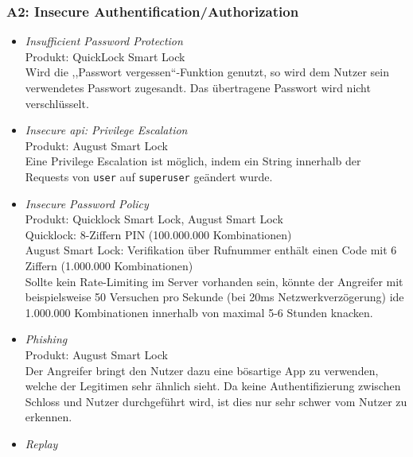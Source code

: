     \subsubsection*{A2: Insecure Authentification/Authorization}
        \begin{itemize}[leftmargin=0cm,label={}]
            \item \emph{Insufficient Password Protection}\cite{Ye2017}\label{vuln:pwdprot}\\
    	        Produkt: QuickLock Smart Lock\\ 
                Wird die ,,Passwort vergessen``-Funktion genutzt, so wird dem Nutzer sein verwendetes Passwort zugesandt. 
                Das übertragene Passwort wird nicht verschlüsselt.
            \item \emph{Insecure \gls{api}: Privilege Escalation}\cite{Fuller2017,Lariviere2015}\label{vuln:privesc}\\
                Produkt: August Smart Lock\\
                Eine Privilege Escalation ist möglich, indem ein String innerhalb der Requests von \colorbox{light-gray}{\lstinline{user}} auf \colorbox{light-gray}{\lstinline{superuser}} geändert wurde.
            \item \emph{Insecure Password Policy}\cite{Rose2016,Ye2017,Jmaxxz2015a}\label{vuln:pwdpol}\\
                Produkt: Quicklock Smart Lock, August Smart Lock\\
                Quicklock: 8-Ziffern PIN (100.000.000 Kombinationen)\\
                August Smart Lock: Verifikation über Rufnummer enthält einen Code mit 6 Ziffern (1.000.000 Kombinationen)\\
                Sollte kein Rate-Limiting im Server vorhanden sein, könnte der Angreifer mit beispielsweise 50 Versuchen pro Sekunde (bei 20ms Netzwerkverzögerung) ide 1.000.000 Kombinationen innerhalb von maximal 5-6 Stunden knacken.
            \item \emph{Phishing}\cite{Ye2017}\label{vuln:phishing}\\
    	        Produkt: August Smart Lock\\ 
                Der Angreifer bringt den Nutzer dazu eine bösartige App zu verwenden, welche der Legitimen sehr ähnlich sieht. 
                Da keine Authentifizierung zwischen Schloss und Nutzer durchgeführt wird, ist dies nur sehr schwer vom Nutzer zu erkennen.
            \item \emph{Replay}\cite{Tierney2018,Rose2016,Ho2016}\label{vuln:replay}\\

\end{itemize}
